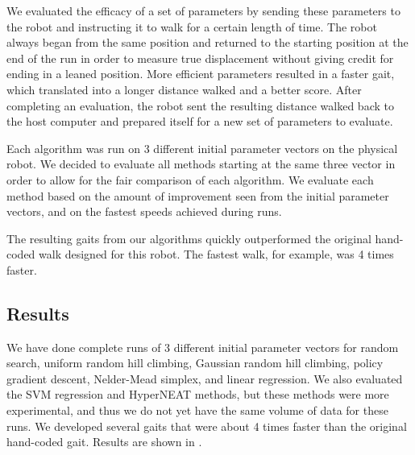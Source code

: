 We evaluated the efficacy of a set of parameters by sending these
parameters to the robot and instructing it to walk for a certain
length of time. The robot always began from the same position and
returned to the starting position at the end of the run in order to
measure true displacement without giving credit for ending in a leaned
position. More efficient parameters resulted in a faster gait, which
translated into a longer distance walked and a better score. After completing
an evaluation, the robot sent the resulting distance walked back to the
host computer and prepared itself for a new set of parameters to evaluate.

Each algorithm was run on 3 different initial parameter vectors on the
physical robot. We decided to evaluate all methods starting at the
same three vector in order to allow for the fair comparison of each
algorithm.  We evaluate each method based on the amount of improvement
seen from the initial parameter vectors, and on the fastest speeds
achieved during runs.

The resulting gaits from our algorithms quickly outperformed the original
hand-coded walk designed for this robot. The fastest walk, for example, was
4 times faster.

\subsection{Results}

We have done complete runs of 3 different initial parameter vectors
for random search, uniform random hill climbing, Gaussian random hill
climbing, policy gradient descent, Nelder-Mead simplex, and linear
regression.  We also evaluated the SVM regression and HyperNEAT
methods, but these methods were more experimental, and thus we do not
yet have the same volume of data for these runs.  We developed several
gaits that were about 4 times faster than the original hand-coded
gait.  Results are shown in .



